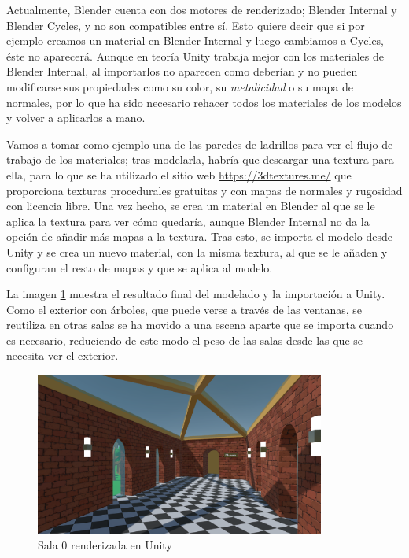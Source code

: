 Actualmente, Blender cuenta con dos motores de renderizado; Blender Internal y Blender Cycles, y no son compatibles entre sí. Esto quiere decir que si por ejemplo creamos un material en Blender Internal y luego cambiamos a Cycles, éste no aparecerá. Aunque en teoría Unity trabaja mejor con los materiales de Blender Internal, al importarlos no aparecen como deberían y no pueden modificarse sus propiedades como su color, su \textit{metalicidad} o su mapa de normales, por lo que ha sido necesario rehacer todos los materiales de los modelos y volver a aplicarlos a mano.

Vamos a tomar como ejemplo una de las paredes de ladrillos para ver el flujo de trabajo de los materiales; tras modelarla, habría que descargar una textura para ella, para lo que se ha utilizado el sitio web \url{https://3dtextures.me/} que proporciona texturas procedurales gratuitas y con mapas de normales y rugosidad con licencia libre. Una vez hecho, se crea un material en Blender al que se le aplica la textura para ver cómo quedaría, aunque Blender Internal no da la opción de añadir más mapas a la textura. Tras esto, se importa el modelo desde Unity y se crea un nuevo material, con la misma textura, al que se le añaden y configuran el resto de mapas y que se aplica al modelo.

La imagen \ref{fig:unity-sala-0} muestra el resultado final del modelado y la importación a Unity. Como el exterior con árboles, que puede verse a través de las ventanas, se reutiliza en otras salas se ha movido a una escena aparte que se importa cuando es necesario, reduciendo de este modo el peso de las salas desde las que se necesita ver el exterior.

\begin{figure}[!h]
\begin{center}
\includegraphics[width=0.85\textwidth]{imagenes/7/salas-unity/unity-sala-0.png}
\caption{Sala 0 renderizada en Unity}
\label{fig:unity-sala-0}
\end{center}
\end{figure}

